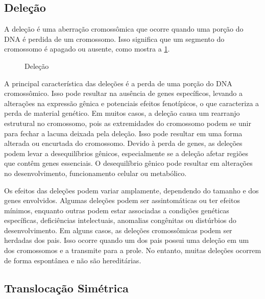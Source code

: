 \documentclass[11pt,a4paper]{article}
\begin{document}
\subsection*{Deleção}

	A deleção é uma aberração cromossômica que ocorre quando uma porção do DNA é perdida de um cromossomo. Isso significa que um segmento do cromossomo é apagado ou ausente, como mostra a \ref{fig:delecao}.
	
	\begin{figure}
		\caption{Deleção}
		\label{fig:delecao}
	\end{figure}
	
	A principal característica das deleções é a perda de uma porção do DNA cromossômico. Isso pode resultar na ausência de genes específicos, levando a alterações na expressão gênica e potenciais efeitos fenotípicos, o que caracteriza a perda de material genético. Em muitos casos, a deleção causa um rearranjo estrutural no cromossomo, pois as extremidades do cromossomo podem se unir para fechar a lacuna deixada pela deleção. Isso pode resultar em uma forma alterada ou encurtada do cromossomo. Devido à perda de genes, as deleções podem levar a desequilíbrios gênicos, especialmente se a deleção afetar regiões que contêm genes essenciais. O desequilíbrio gênico pode resultar em alterações no desenvolvimento, funcionamento celular ou metabólico.

	Os efeitos das deleções podem variar amplamente, dependendo do tamanho e dos genes envolvidos. Algumas deleções podem ser assintomáticas ou ter efeitos mínimos, enquanto outras podem estar associadas a condições genéticas específicas, deficiências intelectuais, anomalias congênitas ou distúrbios do desenvolvimento. Em alguns casos, as deleções cromossômicas podem ser herdadas dos pais. Isso ocorre quando um dos pais possui uma deleção em um dos cromossomos e a transmite para a prole. No entanto, muitas deleções ocorrem de forma espontânea e não são hereditárias.

\subsection*{Translocação Simétrica}
\end{document}
